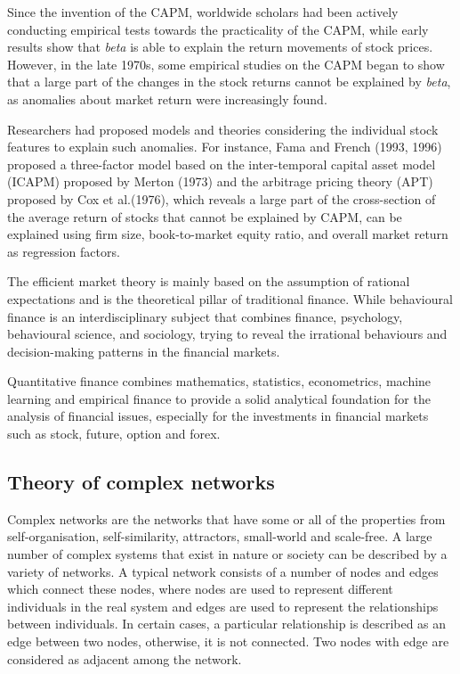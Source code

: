 Since the invention of the CAPM, worldwide scholars had been actively conducting empirical tests towards the practicality of the CAPM, while early results show that \textit{beta} is able to explain the return movements of stock prices. However, in the late 1970s, some empirical studies on the CAPM began to show that a large part of the changes in the stock returns cannot be explained by \textit{beta}, as anomalies about market return were increasingly found.

Researchers had proposed models and theories considering the individual stock features to explain such anomalies. For instance, Fama and French (1993, 1996) proposed a three-factor model based on the inter-temporal capital asset model (ICAPM) \cite{intertemporal} proposed by Merton (1973) and the arbitrage pricing theory (APT)~\cite{options} proposed by Cox et al.(1976), which reveals a large part of the cross-section of the average return of stocks that cannot be explained by CAPM, can be explained using firm size, book-to-market equity ratio, and overall market return~\cite{riskfactors, anomalies} as regression factors.

The efficient market theory is mainly based on the assumption of rational expectations and is the theoretical pillar of traditional finance. While behavioural finance is an interdisciplinary subject that combines finance, psychology, behavioural science, and sociology, trying to reveal the irrational behaviours and decision-making patterns in the financial markets. 


Quantitative finance combines mathematics, statistics, econometrics, machine learning and empirical finance to provide a solid analytical foundation for the analysis of financial issues, especially for the investments in financial markets such as stock, future, option and forex.

\subsection{Theory of complex networks}
Complex networks are the networks that have some or all of the properties from self-organisation, self-similarity, attractors, small-world and scale-free. A large number of complex systems that exist in nature or society can be described by a variety of networks. A typical network consists of a number of nodes and edges which connect these nodes, where nodes are used to represent different individuals in the real system and edges are used to represent the relationships between individuals. In certain cases, a particular relationship is described as an edge between two nodes, otherwise, it is not connected. Two nodes with edge are considered as adjacent among the network.

